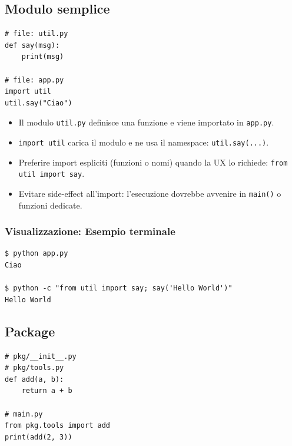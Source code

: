 \subsection{Modulo semplice}
\begin{lstlisting}
# file: util.py
def say(msg):
    print(msg)

# file: app.py
import util
util.say("Ciao")
\end{lstlisting}

\begin{tcolorbox}[title=Spiegazione]
\begin{itemize}
  \item Il modulo \texttt{util.py} definisce una funzione e viene importato in \texttt{app.py}.
  \item \texttt{import util} carica il modulo e ne usa il namespace: \texttt{util.say(...)}.
  \item Preferire import espliciti (funzioni o nomi) quando la UX lo richiede: \texttt{from util import say}.
  \item Evitare side-effect all'import: l'esecuzione dovrebbe avvenire in \texttt{main()} o funzioni dedicate.
\end{itemize}
\end{tcolorbox}

\subsubsection{Visualizzazione: Esempio terminale}
\begin{center}
\begin{tcolorbox}[colback=black!5, colframe=black!75, title=Terminal Output, fonttitle=\ttfamily\bfseries]
\begin{lstlisting}[style=python]
$ python app.py
Ciao

$ python -c "from util import say; say('Hello World')"
Hello World
\end{lstlisting}
\end{tcolorbox}
\end{center}

\subsection{Package}
\begin{lstlisting}
# pkg/__init__.py
# pkg/tools.py
def add(a, b):
    return a + b

# main.py
from pkg.tools import add
print(add(2, 3))
\end{lstlisting}

